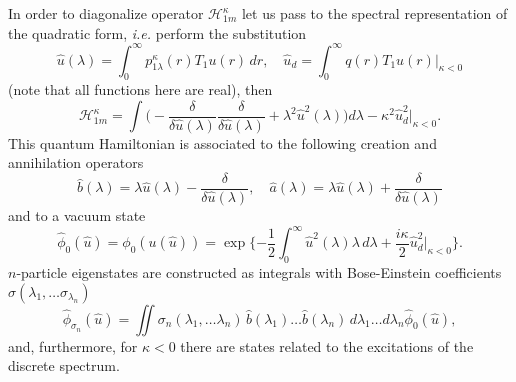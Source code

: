 \documentclass[12pt]{article}
\newcommand{\HH}{\mathscr{H}}
\begin{document}
	In order to diagonalize operator
$ \HH_{1m}^{\kappa} $
	let us pass to the spectral representation of the quadratic form,
	{\it i.e.} perform the substitution
\begin{equation*}
    \hat{u}(\lambda) = \int_{0}^{\infty} p_{1\lambda}^{\kappa}(r)
	T_{1} u(r)\,dr, \quad
	\hat{u}_{d} =  \int_{0}^{\infty} q(r) T_{1} u(r) \bigr|_{\kappa<0}
\end{equation*}
	(note that all functions here are real), then
\begin{equation*}
    \HH_{1m}^{\kappa} = \int \bigl(
-\frac{\delta}{\delta \hat{u}(\lambda)} \frac{\delta}{\delta \hat{u}(\lambda)}
	+ \lambda^{2} \hat{u}^{2}(\lambda) \bigr)d\lambda
	- \kappa^{2} \hat{u}_{d}^{2} \bigr|_{\kappa <0} .
\end{equation*}
	This quantum Hamiltonian is associated to the following
	creation and annihilation operators
\begin{equation*}
    \hat{b}(\lambda) = \lambda \hat{u}(\lambda)
	- \frac{\delta}{\delta \hat{u}(\lambda)} ,\quad
    \hat{a}(\lambda) = \lambda \hat{u}(\lambda) 
	+ \frac{\delta}{\delta \hat{u}(\lambda)}
\end{equation*}
	and to a vacuum state
\begin{equation*}
    \hat{\phi}_{0}(\hat{u}) = \phi_{0}(u(\hat{u})) = \exp\{-\frac{1}{2}
	\int_{0}^{\infty} \hat{u}^{2}(\lambda) \lambda \,d\lambda
	+\frac{i\kappa}{2} \hat{u}_{d}^{2} \bigr|_{\kappa < 0}\} .
\end{equation*}
$ n $-particle eigenstates are constructed as integrals with Bose-Einstein
	coefficients
$ \sigma(\lambda_{1},\ldots \sigma_{\lambda_{n}}) $
\begin{equation}
\label{hatphi}
    \hat{\phi}_{\sigma_{n}}(\hat{u}) = \iint
    \sigma_{n} (\lambda_{1},\ldots \lambda_{n}) \,
	\hat{b}(\lambda_{1}) \ldots \hat{b}(\lambda_{n}) \,
    d\lambda_{1} \ldots d\lambda_{n} \hat{\phi}_{0}(\hat{u}) ,
\end{equation}
	and, furthermore, for
$ \kappa < 0 $
	there are states related to the excitations of the discrete spectrum.
\end{document}
